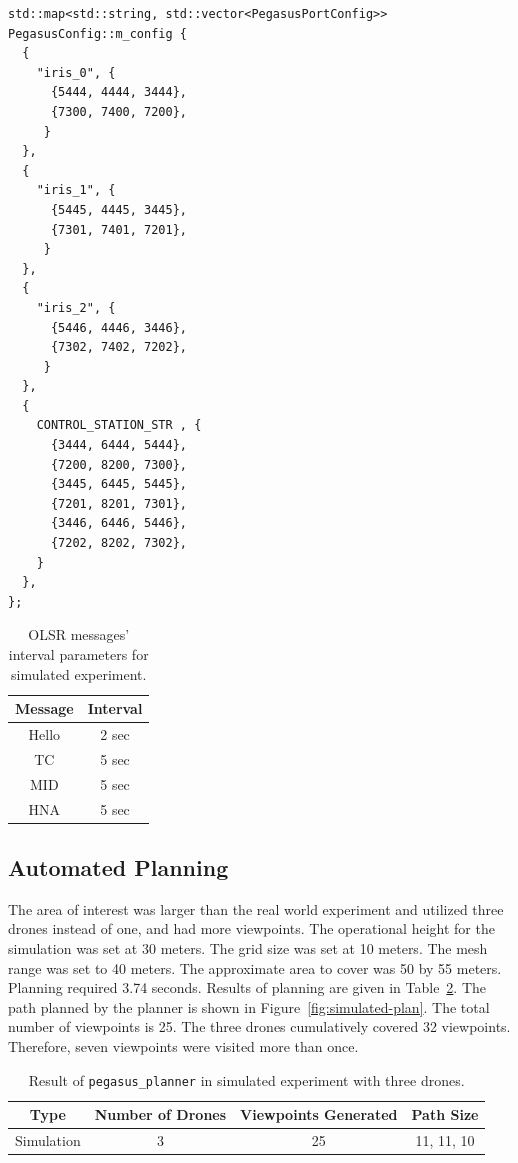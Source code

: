 \begin{verbatim}
std::map<std::string, std::vector<PegasusPortConfig>> 
PegasusConfig::m_config {
  {
    "iris_0", {
      {5444, 4444, 3444},
      {7300, 7400, 7200},
     }
  },
  {
    "iris_1", {
      {5445, 4445, 3445},
      {7301, 7401, 7201},
     }
  },
  {
    "iris_2", {
      {5446, 4446, 3446},
      {7302, 7402, 7202},
     }
  },
  {
    CONTROL_STATION_STR , {
      {3444, 6444, 5444},
      {7200, 8200, 7300},
      {3445, 6445, 5445},
      {7201, 8201, 7301},
      {3446, 6446, 5446},
      {7202, 8202, 7302},
    }
  },
};
\end{verbatim}


\begin{table}[h!]
	\caption[OLSR messsages' interval parameters for simulated experiment.]{OLSR messages' interval parameters for simulated experiment.}
	\begin{center}
		\begin{tabular}{c|c}
			\hline Message & Interval\\ \hline \hline
			Hello & 2 sec \\ \hline
			TC & 5 sec \\ \hline 
			MID & 5 sec  \\ \hline 
			HNA & 5 sec \\ \hline
		\end{tabular}
	\end{center}
	\label{tab:sim-olsr-setting}
\end{table}

\subsection{Automated Planning}
The area of interest was larger than the real world experiment and utilized three drones instead of one, and had more viewpoints. The operational height for the simulation was set at 30 meters. The grid size was set at 10 meters. The mesh range was set to 40 meters. The approximate area to cover was 50 by 55 meters. Planning required 3.74 seconds. Results of planning are given in Table~\ref{tab:simulated-planning}. The path planned by the planner is shown in Figure~\ref{fig:simulated-plan}. The total number of viewpoints is 25. The three drones cumulatively covered 32 viewpoints. Therefore, seven viewpoints were visited more than once. 

\begin{table}[t]
	\caption[Result of \texttt{pegasus\_planner} in simulated experiment with three drones.]{\small Result of \texttt{pegasus\_planner} in simulated experiment with three drones.}
	\begin{center}
		\begin{tabular}{c|c|c|c}
			\hline Type & Number of Drones & Viewpoints Generated & Path Size \\ \hline \hline
			Simulation & 3 & 25 & 11, 11, 10 \\ \hline
		\end{tabular}
	\end{center}
	\label{tab:simulated-planning}
\end{table}

